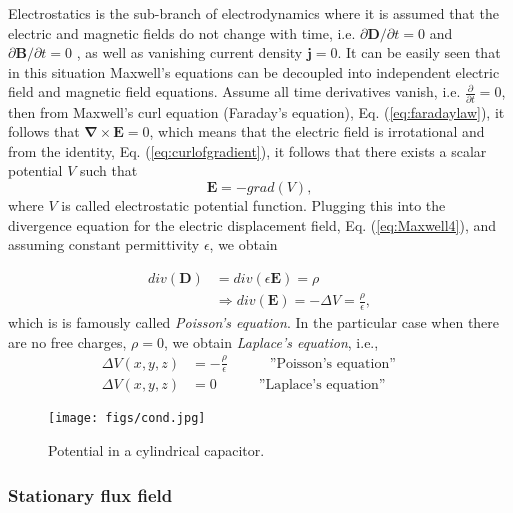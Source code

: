 Electrostatics is the sub-branch of electrodynamics where it is assumed that
the electric and magnetic fields do not change with time, i.e. $\partial
\mathbf{D}/\partial t=0$ and $\partial\mathbf{B}/\partial t=0$ , as well as
vanishing current density $\mathbf{j}=0$. It can be easily seen that in this
situation Maxwell's equations can be decoupled into independent electric field
and magnetic field equations. Assume all time derivatives vanish, i.e.
$\frac{\partial}{\partial t}=0$, then from Maxwell's curl equation (Faraday's
equation), Eq. (\ref{eq:faradaylaw}), it follows that $\mathbf{\nabla}%
\times\mathbf{E}=0$, which means that the electric field is irrotational and
from the identity, Eq. (\ref{eq:curlofgradient}), it follows that there exists
a scalar potential $V$ such that
\[
\mathbf{E}=-grad\left(  V\right)  ,
\]
where $V$ is called electrostatic potential function. Plugging this into the
divergence equation for the electric displacement field, Eq.
(\ref{eq:Maxwell4}), and assuming constant permittivity $\epsilon$, we obtain%

\begin{align*}
div\left(  \mathbf{D}\right)   &  =div\left(  \epsilon\mathbf{E}\right)
=\rho\\
&  \Rightarrow div\left(  \mathbf{E}\right)  =-\Delta{V}=\frac{\rho}{\epsilon
},
\end{align*}
which is is famously called \emph{Poisson's equation}. In the particular case
when there are no free charges, $\rho=0$, we obtain \emph{Laplace's equation},
i.e.,
\begin{align}
\Delta V(x,y,z) &  =-\frac{\rho}{\epsilon}\quad\quad\quad\text{''Poisson's
equation''} &  & \label{eq:poissonequation}\\
\Delta V(x,y,z) &  =0\quad\quad\quad\text{''Laplace's equation''} &  &
\label{eq:laplaceequation}%
\end{align}
\newline \begin{figure}[ptbh]
\centering\texttt{[image: figs/cond.jpg]}\caption{Potential in a
cylindrical capacitor.}%
\label{fig:cond}%
\end{figure}

\subsubsection{Stationary flux field}

